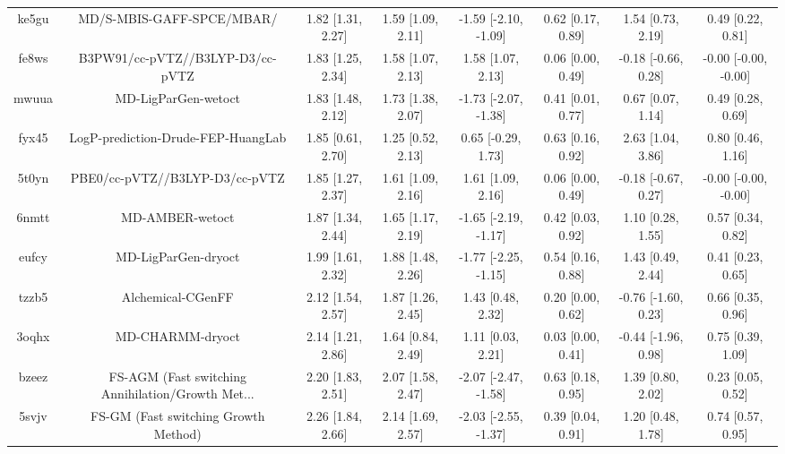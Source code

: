 \documentclass{article}
\begin{document}
\begin{center}
\begin{longtable}{|cccccccc|}
 ke5gu &                          MD/S-MBIS-GAFF-SPCE/MBAR/ &  1.82 [1.31, 2.27] &  1.59 [1.09, 2.11] &  -1.59 [-2.10, -1.09] &  0.62 [0.17, 0.89] &    1.54 [0.73, 2.19] &     0.49 [0.22, 0.81] \\
 fe8ws &                   B3PW91/cc-pVTZ//B3LYP-D3/cc-pVTZ &  1.83 [1.25, 2.34] &  1.58 [1.07, 2.13] &     1.58 [1.07, 2.13] &  0.06 [0.00, 0.49] &  -0.18 [-0.66, 0.28] &  -0.00 [-0.00, -0.00] \\
 mwuua &                                MD-LigParGen-wetoct &  1.83 [1.48, 2.12] &  1.73 [1.38, 2.07] &  -1.73 [-2.07, -1.38] &  0.41 [0.01, 0.77] &    0.67 [0.07, 1.14] &     0.49 [0.28, 0.69] \\
 fyx45 &                 LogP-prediction-Drude-FEP-HuangLab &  1.85 [0.61, 2.70] &  1.25 [0.52, 2.13] &    0.65 [-0.29, 1.73] &  0.63 [0.16, 0.92] &    2.63 [1.04, 3.86] &     0.80 [0.46, 1.16] \\
 5t0yn &                     PBE0/cc-pVTZ//B3LYP-D3/cc-pVTZ &  1.85 [1.27, 2.37] &  1.61 [1.09, 2.16] &     1.61 [1.09, 2.16] &  0.06 [0.00, 0.49] &  -0.18 [-0.67, 0.27] &  -0.00 [-0.00, -0.00] \\
 6nmtt &                                    MD-AMBER-wetoct &  1.87 [1.34, 2.44] &  1.65 [1.17, 2.19] &  -1.65 [-2.19, -1.17] &  0.42 [0.03, 0.92] &    1.10 [0.28, 1.55] &     0.57 [0.34, 0.82] \\
 eufcy &                                MD-LigParGen-dryoct &  1.99 [1.61, 2.32] &  1.88 [1.48, 2.26] &  -1.77 [-2.25, -1.15] &  0.54 [0.16, 0.88] &    1.43 [0.49, 2.44] &     0.41 [0.23, 0.65] \\
 tzzb5 &                                  Alchemical-CGenFF &  2.12 [1.54, 2.57] &  1.87 [1.26, 2.45] &     1.43 [0.48, 2.32] &  0.20 [0.00, 0.62] &  -0.76 [-1.60, 0.23] &     0.66 [0.35, 0.96] \\
 3oqhx &                                   MD-CHARMM-dryoct &  2.14 [1.21, 2.86] &  1.64 [0.84, 2.49] &     1.11 [0.03, 2.21] &  0.03 [0.00, 0.41] &  -0.44 [-1.96, 0.98] &     0.75 [0.39, 1.09] \\
 bzeez &  FS-AGM (Fast switching Annihilation/Growth Met... &  2.20 [1.83, 2.51] &  2.07 [1.58, 2.47] &  -2.07 [-2.47, -1.58] &  0.63 [0.18, 0.95] &    1.39 [0.80, 2.02] &     0.23 [0.05, 0.52] \\
 5svjv &               FS-GM (Fast switching Growth Method) &  2.26 [1.84, 2.66] &  2.14 [1.69, 2.57] &  -2.03 [-2.55, -1.37] &  0.39 [0.04, 0.91] &    1.20 [0.48, 1.78] &     0.74 [0.57, 0.95] \\

\end{longtable}
\end{center}
\end{document}
